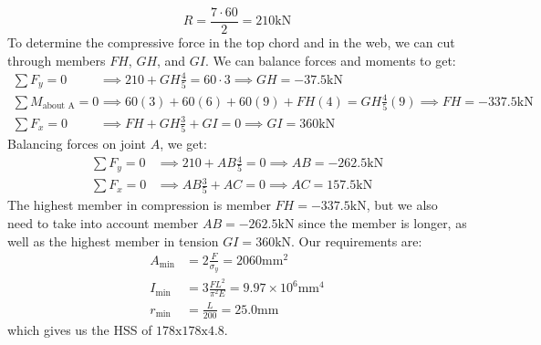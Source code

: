 \documentclass{article}
\begin{document}
\begin{equation}
    R = \frac{7\cdot 60}{2} = 210\si{\kilo\newton}
    \label{eq:}
\end{equation}
To determine the compressive force in the top chord and in the web, we can cut through members $FH$, $GH$, and $GI$. We can balance forces and moments to get:
\begin{align}
    \sum F_y = 0 &\implies 210+GH\frac{4}{5}=60\cdot 3 \implies GH=-37.5\si{\kilo\newton}\\ 
    \sum M_\text{about A} = 0 &\implies 60(3)+60(6)+60(9)+FH(4)=GH\frac{4}{5}(9) \implies FH = -337.5\si{\kilo\newton} \\ 
    \sum F_x = 0 &\implies FH+GH\frac{3}{5}+GI=0 \implies GI = 360\si{\kilo\newton}
    \label{eq:}
\end{align}
Balancing forces on joint $A$, we get:
\begin{align}
    \sum F_y = 0 &\implies 210+AB\frac{4}{5}=0\implies AB=-262.5\si{\kilo\newton} \\ 
    \sum F_x = 0 &\implies AB\frac{3}{5}+AC = 0 \implies AC = 157.5\si{\kilo\newton}
    \label{eq:}
\end{align}
The highest member in compression is member $FH=-337.5\si{\kilo\newton}$, but we also need to take into account member $AB=-262.5\si{\kilo\newton}$ since the member is longer, as well as the highest member in tension $GI=360\si{\kilo\newton}.$ Our requirements are:
\begin{align}
    A_\text{min} &= 2\frac{F}{\sigma_y} = 2060 \si{\milli\meter\squared}\\ 
    I_\text{min} &= 3\frac{FL^2}{\pi^2 E} = 9.97 \times 10^6 \si{\milli\meter\tothe{4}}\\ 
    r_\text{min} &= \frac{L}{200}  = 25.0\si{\milli\meter}
\end{align}
which gives us the HSS of $\boxed{\text{178x178x4.8}}$.
\end{document}
